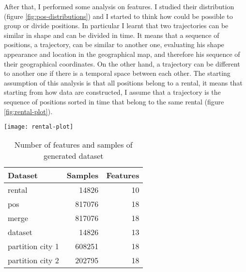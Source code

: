 After that, I performed some analysis on features. I studied their distribution (figure \ref{fig:pos-distributions}) and I started to think how could be possible to group or divide positions. In particular I learnt that two trajectories can be similar in shape and can be divided in time. It means that a sequence of positions, a trajectory, can be similar to another one, evaluating his shape appearance and location in the geographical map, and therefore his sequence of their geographical coordinates. On the other hand, a trajectory can be different to another one if there is a temporal space between each other. The starting assumption of this analysis is that all positions belong to a rental, it means that starting from how data are constructed, I assume that a trajectory is the sequence of positions sorted in time that belong to the same rental (figure \ref{fig:rental-plot}). 

\begin{figure*}[bt]
	\centering
	\texttt{[image: rental-plot]}
	\caption{Trajectories belonging rentals}
	\label{fig:rental-plot}
\end{figure*}

\begin{table}
	\centering
	\caption{Number of features and samples of generated dataset}
	\begin{tabular}{ l r r }
		\hline
		Dataset & Samples & Features \\ \hline
		rental & 14826 & 10 \\ 
		pos & 817076 & 18 \\ 
		merge & 817076 & 18 \\
		dataset & 14826 & 13 \\
		partition city 1 & 608251 & 18 \\
		partition city 2 & 202795 & 18 \\ \hline
	\end{tabular}
\end{table}

